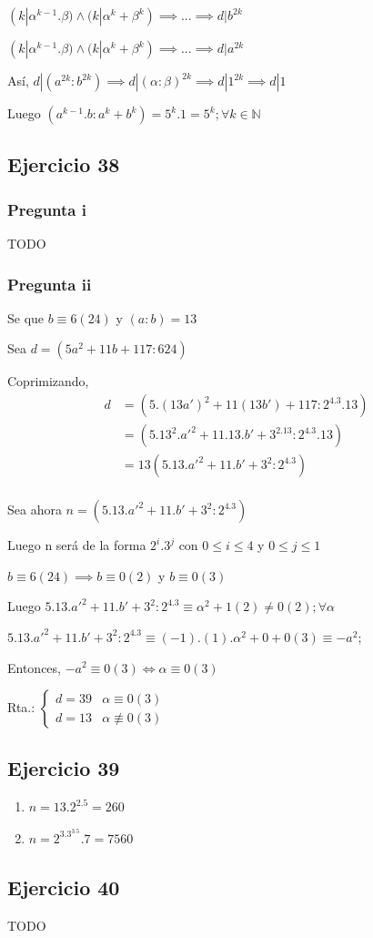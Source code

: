 $ (k|\alpha^{k-1}.\beta) \wedge (k|\alpha^k+\beta^k) \implies ... \implies d|b^{2k}  $

$ (k|\alpha^{k-1}.\beta) \wedge (k|\alpha^k+\beta^k) \implies ... \implies d|a^{2k}  $

Así, $ d|(a^{2k}:b^{2k}) \implies d|(\alpha:\beta)^{2k} \implies d|1^{2k} \implies d|1 $

Luego $ (a^{k-1}.b:a^k+b^k) = 5^k.1 = 5^k; \forall k \in \mathbb{N} $ 

\subsection{Ejercicio 38}
\subsubsection{Pregunta i}
TODO

\subsubsection{Pregunta ii}
Se que $ b\equiv 6(24) $ y $ (a:b)=13 $

Sea $ d = (5a^2+11b+117:624) $

Coprimizando, 
\begin{align*}
    d &= (5.(13a')^2 + 11(13b')+117:2^4.3.13) \\
    &= (5.13^2.a'^2 + 11.13.b'+3^2.13:2^4.3.13) \\
    &= 13(5.13.a'^2 + 11.b'+3^2:2^4.3) \\
\end{align*}

Sea ahora $ n = (5.13.a'^2 + 11.b'+3^2:2^4.3) $

Luego n será de la forma $ 2^i.3^j $ con $ 0\leq i \leq 4 $ y $ 0\leq j\leq 1 $

$ b \equiv 6(24) \implies b \equiv 0 (2) $ y $ b \equiv 0 (3) $

Luego $ 5.13.a'^2 + 11.b'+3^2:2^4.3 \equiv \alpha^2 + 1 (2) \neq 0(2); \forall \alpha $

$ 5.13.a'^2 + 11.b'+3^2:2^4.3 \equiv (-1).(1).\alpha^2 + 0 + 0 (3) \equiv -a^2;$

Entonces, $ -a^2 \equiv 0(3) \iff \alpha \equiv 0 (3) $

Rta.: $ \begin{cases}
    d = 39 & \alpha \equiv 0(3) \\
    d = 13 & \alpha \not \equiv 0(3)
\end{cases}$

\subsection{Ejercicio 39}
\begin{enumerate}
    \item $ n = 13.2^2.5 = 260 $
    \item $ n = 2^3.3^3.5.7 = 7560 $
\end{enumerate}

\subsection{Ejercicio 40}
TODO


